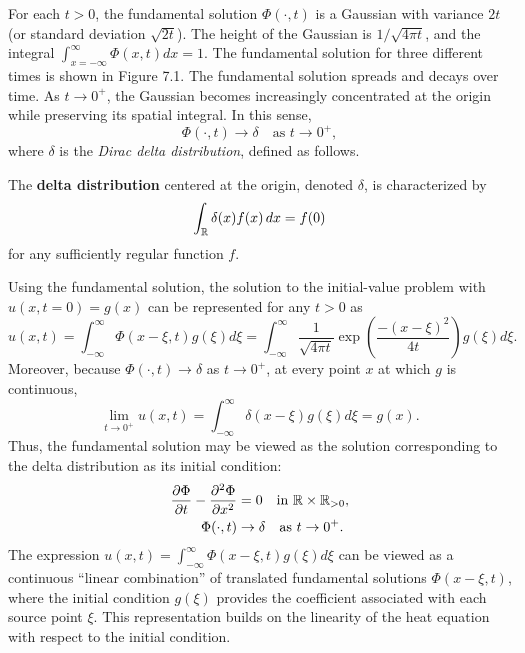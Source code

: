 For each $t > 0$, the fundamental solution $\Phi(\cdot, t)$ is a Gaussian with variance $2t$ (or standard deviation $\sqrt{2t}$). The height of the Gaussian is $1/\sqrt{4\pi t}$, and the integral $\int_{x=-\infty}^{\infty} \Phi(x, t) dx = 1$. The fundamental solution for three different times is shown in Figure 7.1. The fundamental solution spreads and decays over time. As $t \to 0^+$, the Gaussian becomes increasingly concentrated at the origin while preserving its spatial integral. In this sense,
\[\Phi(\cdot, t) \to \delta \quad \text{as } t \to 0^+,\]
where $\delta$ is the \textit{Dirac delta distribution}, defined as follows.

\begin{definition}
    The \textbf{delta distribution} centered at the origin, denoted $\delta$, is characterized by
    \[\int_{\mathbb{R}} \delta(x) f(x)\,dx = f(0)\]
    for any sufficiently regular function $f$.
\end{definition}


Using the fundamental solution, the solution to the initial-value problem with $u(x, t = 0) = g(x)$ can be represented for any $t > 0$ as
\[u(x, t) = \int_{-\infty}^{\infty} \Phi(x - \xi, t) g(\xi) d\xi = \int_{-\infty}^{\infty} \frac{1}{\sqrt{4\pi t}} \exp\left(\frac{-(x - \xi)^2}{4t}\right) g(\xi) d\xi.\]
Moreover, because $\Phi(\cdot, t) \to \delta$ as $t \to 0^+$, at every point $x$ at which $g$ is continuous,
\[\lim_{t \to 0^+} u(x, t) = \int_{-\infty}^{\infty} \delta(x - \xi) g(\xi) d\xi = g(x).\]
Thus, the fundamental solution may be viewed as the solution corresponding to the delta distribution as its initial condition:
\begin{align*}
    \frac{\partial \Phi}{\partial t} - \frac{\partial^2 \Phi}{\partial x^2} &= 0 \quad \text{in } \mathbb{R} \times \mathbb{R}_{>0}, \\
    \Phi(\cdot, t) &\to \delta \quad \text{as } t \to 0^+.
\end{align*}
The expression $u(x, t) = \int_{-\infty}^{\infty} \Phi(x - \xi, t) g(\xi) d\xi$ can be viewed as a continuous ``linear combination'' of translated fundamental solutions $\Phi(x - \xi, t)$, where the initial condition $g(\xi)$ provides the coefficient associated with each source point $\xi$. This representation builds on the linearity of the heat equation with respect to the initial condition.

